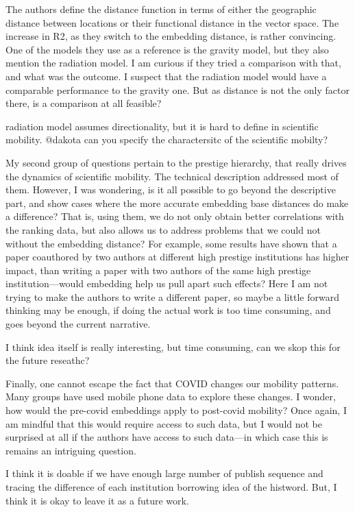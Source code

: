 \documentclass[12pt,a4paper]{article}
\newcommand{\response}[1]{{\leavevmode\noindent #1}}
\newcommand{\rcomment}[1]{%
\vspace{10pt}
\begin{tcolorbox}[colback=black!3,colframe=white!45!black]
#1
\end{tcolorbox}
}
\begin{document}
\rcomment{
The authors define the distance function in terms of either the geographic distance between locations or their functional distance in the vector space. The increase in R2, as they switch to the embedding distance, is rather convincing. One of the models they use as a reference is the gravity model, but they also mention the radiation model. I am curious if they tried a comparison with that, and what was the outcome. I suspect that the radiation model would have a comparable performance to the gravity one. But as distance is not the only factor there, is a comparison at all feasible?
}
\response{
radiation model assumes directionality, but it is hard to define in scientific mobility.
@dakota can you specify the charactersitc of the scientific mobilty?
}

\rcomment{
  My second group of questions pertain to the prestige hierarchy, that really drives the dynamics of scientific mobility. The technical description addressed most of them. However, I was wondering, is it all possible to go beyond the descriptive part, and show cases where the more accurate embedding base distances do make a difference? That is, using them, we do not only obtain better correlations with the ranking data, but also allows us to address problems that we could not without the embedding distance? For example, some results have shown that a paper coauthored by two authors at different high prestige institutions has higher impact, than writing a paper with two authors of the same high prestige institution—would embedding help us pull apart such effects? Here I am not trying to make the authors to write a different paper, so maybe a little forward thinking may be enough, if doing the actual work is too time consuming, and goes beyond the current narrative.
}

\response{
 	I think idea itself is really interesting, but time consuming, can we skop this for the future reseathc?

}


\rcomment{
Finally, one cannot escape the fact that COVID changes our mobility patterns. Many groups have used mobile phone data to explore these changes. I wonder, how would the pre-covid embeddings apply to post-covid mobility? Once again, I am mindful that this would require access to such data, but I would not be surprised at all if the authors have access to such data—in which case this is remains an intriguing question.
}

\response{
 	I think it is doable if we have enough large number of publish sequence and tracing the difference of each institution borrowing idea of the histword. But, I think it is okay to leave it as a future work.

}


%

\end{document}
